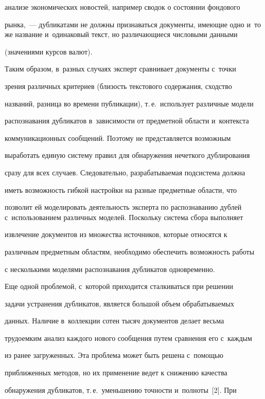 анализе экономических новостей, например сводок о состоянии фондового

рынка,~--- дубликатами не должны признаваться документы, имеющие одно и~то же название и~одинаковый текст, но различающиеся числовыми данными

(значениями курсов валют).



  Таким образом, в~разных случаях эксперт сравнивает документы с~точки

зрения различных критериев (близость текстового содержания, сходство

названий, разница во времени публикации), т.\,е.\ использует различные модели

распознавания дубликатов в~зависимости от предметной области и~контекста

коммуникационных сообщений. Поэтому не представляется возможным

выработать единую систему правил для обнаружения нечеткого дублирования

сразу для всех случаев. Следовательно, разрабатываемая подсистема должна

иметь возможность гибкой настройки на разные предметные области, что

позволит ей моделировать деятельность эксперта по распознаванию дублей с~использованием различных моделей. Поскольку система сбора выполняет

извлечение документов из множества источников, которые относятся к

различным предметным областям, необходимо обеспечить возможность работы

с несколькими моделями распознавания дубликатов одновременно.



  Еще одной проблемой, с~которой приходится сталкиваться при решении

задачи устранения дубликатов, является большой объем обрабатываемых

данных. Наличие в~коллекции сотен тысяч документов делает весьма

трудоемким анализ каждого нового сообщения путем сравнения его с~каждым

из ранее загруженных. Эта проблема может быть решена с~помощью

приближенных методов, но их применение ведет к снижению качества

обнаружения дубликатов, т.\,е.\ уменьшению точности и~полноты~[2]. При

